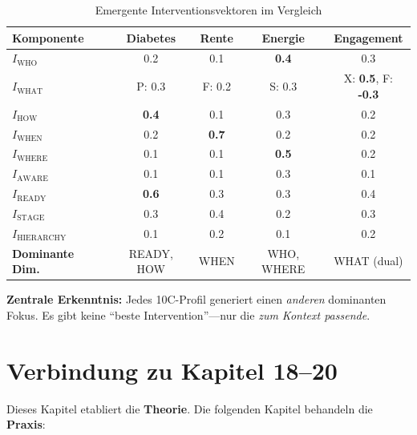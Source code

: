 \begin{table}[htbp]
\centering
\caption{Emergente Interventionsvektoren im Vergleich}
\label{tab:17-comparison}
\renewcommand{\arraystretch}{1.3}
\small
\begin{tabular}{@{}lcccc@{}}
\toprule
\textbf{Komponente} & \textbf{Diabetes} & \textbf{Rente} & \textbf{Energie} & \textbf{Engagement} \\
\midrule
$I_{\text{WHO}}$ & 0.2 & 0.1 & \textbf{0.4} & 0.3 \\
$I_{\text{WHAT}}$ & P: 0.3 & F: 0.2 & S: 0.3 & X: \textbf{0.5}, F: \textbf{-0.3} \\
$I_{\text{HOW}}$ & \textbf{0.4} & 0.1 & 0.3 & 0.2 \\
$I_{\text{WHEN}}$ & 0.2 & \textbf{0.7} & 0.2 & 0.2 \\
$I_{\text{WHERE}}$ & 0.1 & 0.1 & \textbf{0.5} & 0.2 \\
$I_{\text{AWARE}}$ & 0.1 & 0.1 & 0.3 & 0.1 \\
$I_{\text{READY}}$ & \textbf{0.6} & 0.3 & 0.3 & 0.4 \\
$I_{\text{STAGE}}$ & 0.3 & 0.4 & 0.2 & 0.3 \\
$I_{\text{HIERARCHY}}$ & 0.1 & 0.2 & 0.1 & 0.2 \\
\midrule
\textbf{Dominante Dim.} & READY, HOW & WHEN & WHO, WHERE & WHAT (dual) \\
\bottomrule
\end{tabular}
\end{table}

\textbf{Zentrale Erkenntnis:} Jedes 10C-Profil generiert einen \textit{anderen} dominanten Fokus. Es gibt keine ``beste Intervention''---nur die \textit{zum Kontext passende}.



\section{Verbindung zu Kapitel 18--20}
\label{sec:17-connection}

Dieses Kapitel etabliert die \textbf{Theorie}. Die folgenden Kapitel behandeln die \textbf{Praxis}:


